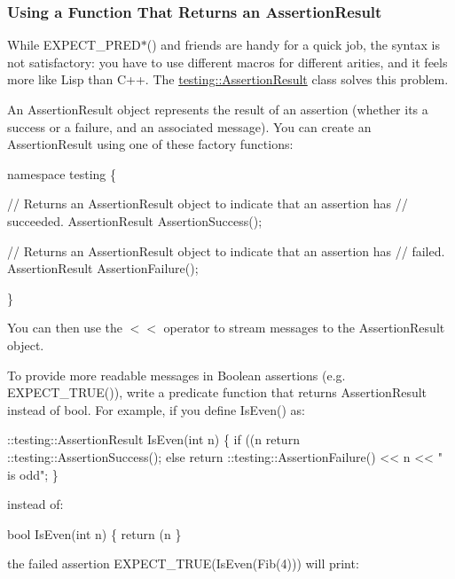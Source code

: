\subsubsection*{Using a Function That Returns an Assertion\+Result}

While {\ttfamily E\+X\+P\+E\+C\+T\+\_\+\+P\+R\+E\+D$\ast$()} and friends are handy for a quick job, the syntax is not satisfactory\+: you have to use different macros for different arities, and it feels more like Lisp than C++. The {\ttfamily \mbox{\hyperlink{classtesting_1_1_assertion_result}{testing\+::\+Assertion\+Result}}} class solves this problem.

An {\ttfamily Assertion\+Result} object represents the result of an assertion (whether it\textquotesingle{}s a success or a failure, and an associated message). You can create an {\ttfamily Assertion\+Result} using one of these factory functions\+:


\begin{DoxyCode}
namespace testing \{

// Returns an AssertionResult object to indicate that an assertion has
// succeeded.
AssertionResult AssertionSuccess();

// Returns an AssertionResult object to indicate that an assertion has
// failed.
AssertionResult AssertionFailure();

\}
\end{DoxyCode}


You can then use the {\ttfamily $<$$<$} operator to stream messages to the {\ttfamily Assertion\+Result} object.

To provide more readable messages in Boolean assertions (e.\+g. {\ttfamily E\+X\+P\+E\+C\+T\+\_\+\+T\+R\+U\+E()}), write a predicate function that returns {\ttfamily Assertion\+Result} instead of {\ttfamily bool}. For example, if you define {\ttfamily Is\+Even()} as\+:


\begin{DoxyCode}
::testing::AssertionResult IsEven(int n) \{
  if ((n %
    return ::testing::AssertionSuccess();
  else
    return ::testing::AssertionFailure() << n << " is odd";
\}
\end{DoxyCode}


instead of\+:


\begin{DoxyCode}
bool IsEven(int n) \{
  return (n %
\}
\end{DoxyCode}


the failed assertion {\ttfamily E\+X\+P\+E\+C\+T\+\_\+\+T\+R\+UE(Is\+Even(\+Fib(4)))} will print\+:


